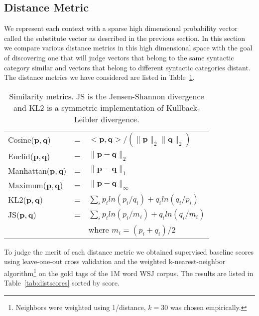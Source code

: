 \subsection{Distance Metric}
\label{sec:dist}

We represent each context with a sparse high dimensional probability
vector called the substitute vector as described in the previous
section.  In this section we compare various distance metrics in this
high dimensional space with the goal of discovering one that will
judge vectors that belong to the same syntactic category similar and
vectors that belong to different syntactic categories distant.  The
distance metrics we have considered are listed in
Table~\ref{tab:metrics}.


\begin{table}[ht] \centering
\small
\begin{tabular}{|lll|}
\hline
Cosine($\mathbf{p}, \mathbf{q}$) & = & $<\mathbf{p},\mathbf{q}> / (\|\mathbf{p}\|_{2} \|\mathbf{q}\|_{2})$ \\
Euclid($\mathbf{p}, \mathbf{q}$) & = & $\|\mathbf{p} - \mathbf{q}\|_{2}$ \\
Manhattan($\mathbf{p}, \mathbf{q}$) & = & $\|\mathbf{p} - \mathbf{q}\|_{1}$ \\
Maximum($\mathbf{p}, \mathbf{q}$) & = & $\|\mathbf{p} - \mathbf{q}\|_{\infty}$ \\
KL2($\mathbf{p}, \mathbf{q}$) & = & $\sum_i p_iln(p_i/q_i) + q_iln(q_i/p_i) $\\
JS($\mathbf{p}, \mathbf{q}$) & = & $\sum_i p_iln(p_i/m_i) + q_iln(q_i/m_i) $\\
& & where $m_i = (p_i + q_i) / 2$\\
\hline
\end{tabular}
\caption{Similarity metrics.  JS is the Jensen-Shannon divergence and
  KL2 is a symmetric implementation of Kullback-Leibler divergence.}
\label{tab:metrics}
\end{table}


To judge the merit of each distance metric we obtained supervised
baseline scores using leave-one-out cross validation and the weighted
k-nearest-neighbor algorithm\footnote{Neighbors were weighted using
  1/distance, $k=30$ was chosen empirically.} on the gold tags of the
1M word WSJ corpus.  The results are listed in
Table~\ref{tab:distscores} sorted by score.


